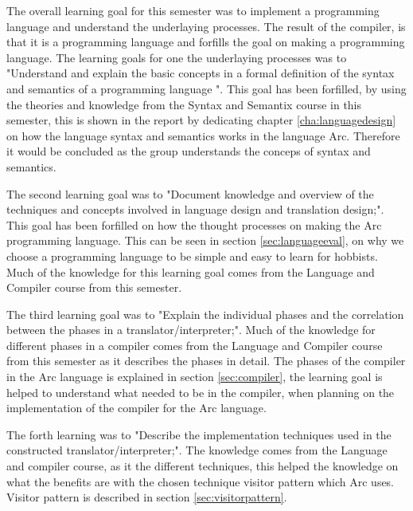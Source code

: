 The overall learning goal for this semester was to implement a programming language and understand the underlaying processes. The result of the compiler, is that it is a programming language and forfills the goal on making a programming language. The learning goals for one the underlaying processes was to "Understand and explain the basic concepts in a formal definition of the syntax and semantics of a programming language ". This goal has been forfilled, by using the theories and knowledge from the Syntax and Semantix course in this semester, this is shown in the report by dedicating chapter \ref{cha:languagedesign} on how the language syntax and semantics works in the language Arc. Therefore it would be concluded as the group understands the conceps of syntax and semantics.

The second learning goal was to "Document knowledge and overview of the techniques and concepts involved in language design and translation design;". This goal has been forfilled on how the thought processes on making the Arc programming language. This can be seen in section \ref{sec:languageeval}, on why we choose a programming language to be simple and easy to learn for hobbists. Much of the knowledge for this learning goal comes from the Language and Compiler course from this semester. 
 
The third learning goal was to "Explain the individual phases and the correlation between the phases in a translator/interpreter;". Much of the knowledge for different phases in a compiler comes from the Language and Compiler course from this semester as it describes the phases in detail. The phases of the compiler in the Arc language is explained in section \ref{sec:compiler}, the learning goal is helped to understand what needed to be in the compiler, when planning on the implementation of the compiler for the Arc language. 
 
The forth learning was to "Describe the implementation techniques used in the constructed translator/interpreter;". The knowledge comes from the Language and compiler course, as it the different techniques, this helped the knowledge on what the benefits are with the chosen technique visitor pattern which Arc uses. Visitor pattern is described in section \ref{sec:visitorpattern}.  